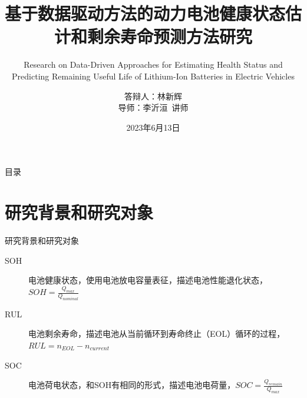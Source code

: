 \documentclass{beamer}
\author[林新辉]{答辩人：林新辉 \\ [5mm] 导师：李沂洹\ 讲师}
\title{基于数据驱动方法的动力电池健康状态估计和剩余寿命预测方法研究}
\subtitle{Research on Data-Driven Approaches for Estimating Health Status and Predicting Remaining Useful Life of Lithium-Ion Batteries in Electric Vehicles}
\institute{控制与计算机工程学院，华北电力大学}
\date{2023年6月13日}
\begin{document}
\kaishu
\begin{frame}
\titlepage
\end{frame}

\begin{frame}{\small 目录}
\tableofcontents[sectionstyle=show,subsectionstyle=show/shaded/hide,subsubsectionstyle=show/shaded/hide]
\end{frame}

\section{研究背景和研究对象}

\begin{frame}{\small 研究背景和研究对象}
	\begin{figure}[htbp]    %
		  \centering            %
		\end{figure}
	\begin{description}
		\item[SOH]
		电池健康状态，使用电池放电容量表征，描述电池性能退化状态，$SOH = \frac{Q_{max}}{Q_{nominal}}$
		\item[RUL]
		电池剩余寿命，描述电池从当前循环到寿命终止（EOL）循环的过程，$RUL = n_{EOL} - n_{current}$
		\item[SOC]
		电池荷电状态，和SOH有相同的形式，描述电池电荷量，$SOC = \frac{Q_{remain}}{Q_{max}}$
	\end{description}
\end{frame}
\end{document}
